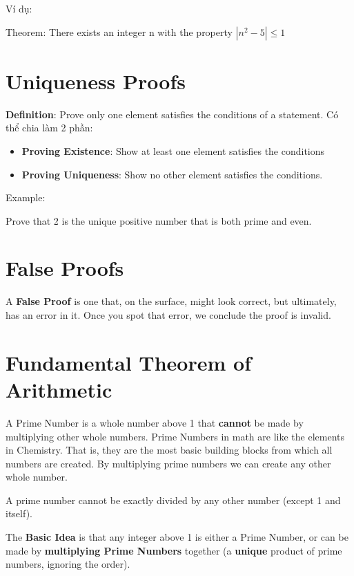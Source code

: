 Ví dụ:

Theorem: There exists an integer n with the property $|n^{2}-5| \leq 1$

\section{Uniqueness Proofs}

\textbf{Definition}: Prove only one element satisfies the conditions of a statement. Có thể chia làm 2 phần:

\begin{itemize}
  \item \textbf{Proving Existence}: Show at least one element satisfies the conditions
  \item \textbf{Proving Uniqueness}: Show no other element satisfies the conditions.
\end{itemize}

Example:

Prove that 2 is the unique positive number that is both prime and even.

\section{False Proofs}

A \textbf{False Proof} is one that, on the surface, might look correct, but ultimately, has an error in it. Once you spot that error, we conclude the proof is invalid.

\section{Fundamental Theorem of Arithmetic}

A Prime Number is a whole number above 1 that \textbf{cannot} be made by multiplying other whole numbers. Prime Numbers in math are like the elements in Chemistry. That is, they are the most basic building blocks from which all numbers are created. By multiplying prime numbers we can create any other whole number.

A prime number cannot be exactly divided by any other number (except 1 and itself).

\vspace{8 mm}

The \textbf{Basic Idea} is that any integer above 1 is either a Prime Number, or can be made by \textbf{multiplying Prime Numbers} together (a \textbf{unique} product of prime numbers, ignoring the order).

